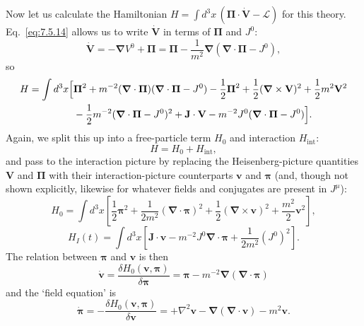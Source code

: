 Now let us calculate the Hamiltonian
$H=\int d^3x\,(\boldsymbol\Pi\cdot\dot{\mathbf V}-\mathcal L)$ for this
theory. Eq.~\eqref{eq:7.5.14} allows us to write $\dot{\mathbf V}$ in terms of
$\boldsymbol\Pi$ and $J^0$:
\[
\dot{\mathbf V}=-\boldsymbol\nabla V^0+\boldsymbol\Pi
=\boldsymbol\Pi-\frac1{m^2}\boldsymbol\nabla
(\boldsymbol\nabla\cdot\boldsymbol\Pi-J^0),
\]
so
\begin{align*}
H=\int d^3x\Bigl[&\boldsymbol\Pi^2
+m^{-2}(\boldsymbol\nabla\cdot\boldsymbol\Pi)
(\boldsymbol\nabla\cdot\boldsymbol\Pi-J^0)
-\frac12\boldsymbol\Pi^2+\frac12(\boldsymbol\nabla\times\mathbf V)^2
+\frac12m^2\mathbf V^2\notag\\
&-\frac12m^{-2}(\boldsymbol\nabla\cdot\boldsymbol\Pi-J^0)^2
+\mathbf J\cdot\mathbf V
-m^{-2}J^0(\boldsymbol\nabla\cdot\boldsymbol\Pi-J^0)\Bigr].
\end{align*}
Again, we split this up into a free-particle term $H_0$ and interaction
$H_{\mathrm{int}}$:
\begin{equation}
H=H_0+H_{\mathrm{int}},
\tag{7.5.17}\label{eq:7.5.17}
\end{equation}
and pass to the interaction picture by replacing the Heisenberg-picture
quantities $\mathbf V$ and $\boldsymbol\Pi$ with their interaction-picture
counterparts $\mathbf v$ and $\boldsymbol\pi$ (and, though not shown
explicitly, likewise for whatever fields and conjugates are present in
$J^\mu$):
\begin{equation}
H_0=\int d^3x\left[\frac12\boldsymbol\pi^2
+\frac1{2m^2}(\boldsymbol\nabla\cdot\boldsymbol\pi)^2
+\frac12(\boldsymbol\nabla\times\mathbf v)^2
+\frac{m^2}{2}\mathbf v^2\right],
\tag{7.5.18}\label{eq:7.5.18}
\end{equation}
\begin{equation}
H_I(t)=\int d^3x\left[\mathbf J\cdot\mathbf v
-m^{-2}J^0\boldsymbol\nabla\cdot\boldsymbol\pi
+\frac1{2m^2}(J^0)^2\right].
\tag{7.5.19}\label{eq:7.5.19}
\end{equation}
The relation between $\boldsymbol\pi$ and $\mathbf v$ is then
\begin{equation}
\dot{\mathbf v}=\frac{\delta H_0(\mathbf v,\boldsymbol\pi)}
{\delta\boldsymbol\pi}
=\boldsymbol\pi-m^{-2}\boldsymbol\nabla
(\boldsymbol\nabla\cdot\boldsymbol\pi)
\tag{7.5.20}\label{eq:7.5.20}
\end{equation}
and the `field equation' is
\begin{equation}
\dot{\boldsymbol\pi}=-\frac{\delta H_0(\mathbf v,\boldsymbol\pi)}
{\delta\mathbf v}
=+\nabla^2\mathbf v-\boldsymbol\nabla(\boldsymbol\nabla\cdot\mathbf v)
-m^2\mathbf v.
\tag{7.5.21}\label{eq:7.5.21}
\end{equation}
